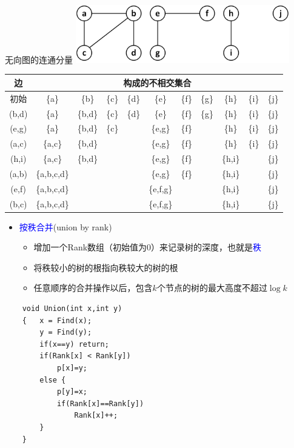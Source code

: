 \begin{frame}{无向图的连通分量}
    \includegraphics[width=0.7\textwidth,center]{fig/6-1.png}
    \begin{table}
        \begin{tabular}{c|c|c|c|c|c|c|c|c|c|c}
            边   & \multicolumn{10}{c}{构成的不相交集合} \\\hline
            初始     & \{a\}         & \{b\}   & \{c\}  & \{d\}  & \{e\}     & \{f\}  & \{g\}  & \{h\}   & \{i\}  & \{j\}  \\\hline
            (b,d)   & \{a\}         & \{b,d\} & \{c\}  & \{d\}  & \{e\}     & \{f\}  & \{g\}  & \{h\}   & \{i\}  & \{j\}   \\\hline
            (e,g)   & \{a\}         & \{b,d\} & \{c\}  &      & \{e,g\}   & \{f\}  &      & \{h\}   & \{i\}  & \{j\}   \\\hline
            (a,c)   & \{a,c\}        & \{b,d\} &      &      & \{e,g\}   & \{f\}  &      & \{h\}   & \{i\}  & \{j\}   \\\hline
            (h,i)   & \{a,c\}        & \{b,d\} &      &      & \{e,g\}   & \{f\}  &      & \{h,i\} &      & \{j\}   \\\hline
            (a,b)   & \{a,b,c,d\}    &       &      &      & \{e,g\}   & \{f\}  &      & \{h,i\} &      & \{j\}   \\\hline
            (e,f)   & \{a,b,c,d\}    &       &      &      & \{e,f,g\} &      &      & \{h,i\} &      & \{j\}   \\\hline
            (b,c)   & \{a,b,c,d\}    &       &      &      & \{e,f,g\} &      &      & \{h,i\} &      & \{j\}   \\\hline
        \end{tabular}
    \end{table}
\end{frame}
\begin{itemize}
    \item \textcolor{blue}{按秩合并}(union by rank)
    \begin{itemize}
        \item 增加一个Rank数组（初始值为0）来记录树的深度，也就是\textcolor{blue}{秩}
        \item 将秩较小的树的根指向秩较大的树的根
        \item 任意顺序的合并操作以后，包含$k$个节点的树的最大高度不超过$\log k$
    \end{itemize} 
\end{itemize}
\begin{lstlisting}
    void Union(int x,int y)  
    {   x = Find(x);
        y = Find(y);
        if(x==y) return;
        if(Rank[x] < Rank[y])
            p[x]=y;
        else {
            p[y]=x;
            if(Rank[x]==Rank[y])
                Rank[x]++;
        }
    }
\end{lstlisting}
    
